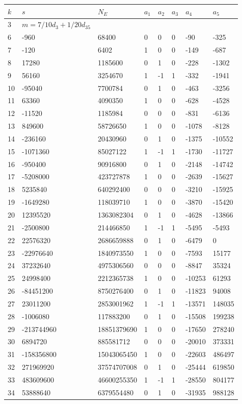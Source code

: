 \documentclass{amsart}
\begin{document}
\begin{longtable}{|l|l|l|lllll|}
\hline
$k$ & $s$ & $N_E$ & $a_1$ & $a_2$ & $a_3$ & $a_4$ & $a_5$\\
\hline
3&$m=7/10d_{3}+1/20d_{35}$&&\multicolumn{5}{c|}{}\\
6&-960&68400&0&0&0&-90&-325\\
7&-120&6402&1&0&0&-149&-687\\
8&17280&1185600&0&1&0&-228&-1302\\
9&56160&3254670&1&-1&1&-332&-1941\\
10&-95040&7700784&0&1&0&-463&-3256\\
11&63360&4090350&1&0&0&-628&-4528\\
12&-11520&1185984&0&0&0&-831&-6136\\
13&849600&58726650&1&0&0&-1078&-8128\\
14&-236160&20430960&0&1&0&-1375&-10552\\
15&-1071360&85027122&1&-1&1&-1730&-11727\\
16&-950400&90916800&0&1&0&-2148&-14742\\
17&-5208000&423727878&1&0&0&-2639&-15627\\
18&5235840&640292400&0&0&0&-3210&-15925\\
19&-1649280&118039710&1&0&0&-3870&-15420\\
20&12395520&1363082304&0&1&0&-4628&-13866\\
21&-2500800&214466850&1&-1&1&-5495&-5493\\
22&22576320&2686659888&0&1&0&-6479&0\\
23&-22976640&1840973550&1&0&0&-7593&15177\\
24&37232640&4975306560&0&0&0&-8847&35324\\
25&24998400&2212365738&1&0&0&-10253&61293\\
26&-84451200&8750276400&0&1&0&-11823&94008\\
27&23011200&2853001962&1&-1&1&-13571&148035\\
28&-1006080&117883200&0&1&0&-15508&199238\\
29&-213744960&18851379690&1&0&0&-17650&278240\\
30&6894720&885581712&0&0&0&-20010&373331\\
31&-158356800&15043065450&1&0&0&-22603&486497\\
32&271969920&37574707008&0&1&0&-25444&619850\\
33&483609600&46600255350&1&-1&1&-28550&804177\\
34&53888640&6379554480&0&1&0&-31935&988128\\

\end{longtable}
\end{document}
